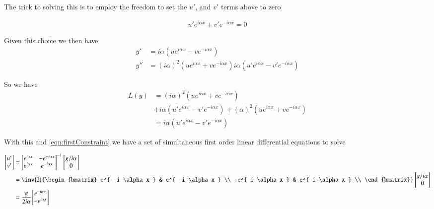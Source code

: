 \documentclass{article}
\begin{document}
The trick to solving this is to employ the freedom to set the $u'$, and $v'$ terms above to zero

\begin{align}\label{eqn:firstConstraint}
u' e^{ i \alpha x } + v' e^{ -i \alpha x } = 0 
\end{align}

Given this choice we then have
\begin{align*}
y' &= i \alpha (u e^{ i \alpha x } - v e^{ -i \alpha x }) \\
y'' &= 
(i \alpha)^2 (u e^{ i \alpha x } + v e^{ -i \alpha x }) 
i \alpha (u' e^{ i \alpha x } - v' e^{ -i \alpha x }) 
\end{align*}

So we have
\begin{align*}
L(y) 
&=
(i \alpha)^2 (u e^{ i \alpha x } + v e^{ -i \alpha x })  \\
&+i \alpha (u' e^{ i \alpha x } - v' e^{ -i \alpha x }) 
+ (\alpha)^2 (u e^{ i \alpha x } + v e^{ -i \alpha x })  \\
&=
i \alpha (u' e^{ i \alpha x } - v' e^{ -i \alpha x }) 
\end{align*}

With this and \ref{eqn:firstConstraint} we have a set of simultaneous first order linear differential equations to solve

\begin{align*}
\begin{bmatrix}
u' \\
v' \\
\end{bmatrix}
&=
{\begin{bmatrix}
 e^{ i \alpha x } &- e^{ -i \alpha x } \\
 e^{ i \alpha x } &  e^{ -i \alpha x } \\
\end{bmatrix}}^{-1}
\begin{bmatrix}
{g}/{i \alpha} \\
0 \\
\end{bmatrix} \\
&=
\inv{2}
{\begin{bmatrix}
 e^{ -i \alpha x } & e^{ -i \alpha x } \\
 -e^{ i \alpha x } &  e^{ i \alpha x } \\
\end{bmatrix}}
\begin{bmatrix}
{g}/{i \alpha} \\
0 \\
\end{bmatrix} \\
&=
\frac{g}{2 i \alpha} 
{\begin{bmatrix}
 e^{ -i \alpha x } \\
 -e^{ i \alpha x } \\
\end{bmatrix}}
\end{align*}
\end{document}
